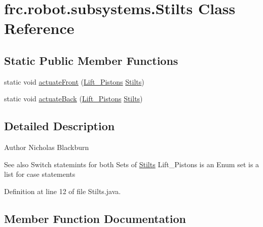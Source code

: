 \hypertarget{classfrc_1_1robot_1_1subsystems_1_1_stilts}{}\section{frc.\+robot.\+subsystems.\+Stilts Class Reference}
\label{classfrc_1_1robot_1_1subsystems_1_1_stilts}
\subsection*{Static Public Member Functions}
\begin{DoxyCompactItemize}
\item 
static void \hyperlink{classfrc_1_1robot_1_1subsystems_1_1_stilts_af50dae1fe4775c73cefb856685f1e99a}{actuate\+Front} (\hyperlink{enumfrc_1_1robot_1_1_enums_1_1_lift___pistons}{Lift\+\_\+\+Pistons} \hyperlink{classfrc_1_1robot_1_1subsystems_1_1_stilts}{Stilts})
\item 
static void \hyperlink{classfrc_1_1robot_1_1subsystems_1_1_stilts_a450a870f59c6692eaac864def617ec71}{actuate\+Back} (\hyperlink{enumfrc_1_1robot_1_1_enums_1_1_lift___pistons}{Lift\+\_\+\+Pistons} \hyperlink{classfrc_1_1robot_1_1subsystems_1_1_stilts}{Stilts})
\end{DoxyCompactItemize}


\subsection{Detailed Description}
\begin{DoxyAuthor}{Author}
Nicholas Blackburn 
\end{DoxyAuthor}
\begin{DoxySeeAlso}{See also}
Switch statemints for both Sets of \hyperlink{classfrc_1_1robot_1_1subsystems_1_1_stilts}{Stilts} Lift\+\_\+\+Pistons is an Enum set is a list for case statements 
\end{DoxySeeAlso}


Definition at line 12 of file Stilts.\+java.



\subsection{Member Function Documentation}
\mbox{\label{classfrc_1_1robot_1_1subsystems_1_1_stilts_a450a870f59c6692eaac864def617ec71}} 
